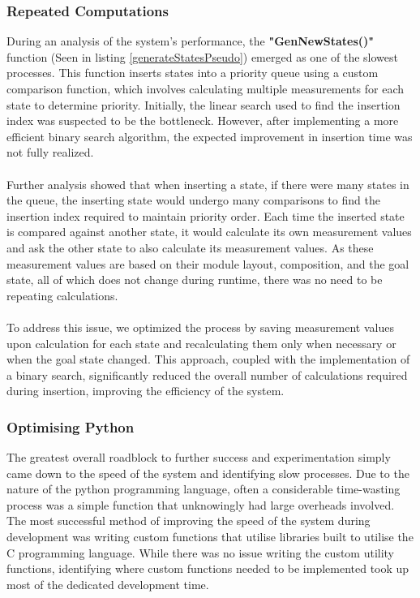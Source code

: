 \subsubsection{Repeated Computations}
During an analysis of the system's performance, the \textbf{"GenNewStates()"} function (Seen in listing \ref{generateStatesPseudo}) emerged as one of the slowest processes. This function inserts states into a priority queue using a custom comparison function, which involves calculating multiple measurements for each state to determine priority. Initially, the linear search used to find the insertion index was suspected to be the bottleneck. However, after implementing a more efficient binary search algorithm, the expected improvement in insertion time was not fully realized.
\\\\
Further analysis showed that when inserting a state, if there were many states in the queue, the inserting state would undergo many comparisons to find the insertion index required to maintain priority order. Each time the inserted state is compared against another state, it would calculate its own measurement values and ask the other state to also calculate its measurement values. As these measurement values are based on their module layout, composition, and the goal state, all of which does not change during runtime, there was no need to be repeating calculations. 
\\\\
To address this issue, we optimized the process by saving measurement values upon calculation for each state and recalculating them only when necessary or when the goal state changed. This approach, coupled with the implementation of a binary search, significantly reduced the overall number of calculations required during insertion, improving the efficiency of the system.

\subsubsection{Optimising Python}
The greatest overall roadblock to further success and experimentation simply came down to the speed of the system and identifying slow processes. Due to the nature of the python programming language, often a considerable time-wasting process was a simple function that unknowingly had large overheads involved. The most successful method of improving the speed of the system during development was writing custom functions that utilise libraries built to utilise the C programming language. While there was no issue writing the custom utility functions, identifying where custom functions needed to be implemented took up most of the dedicated development time.